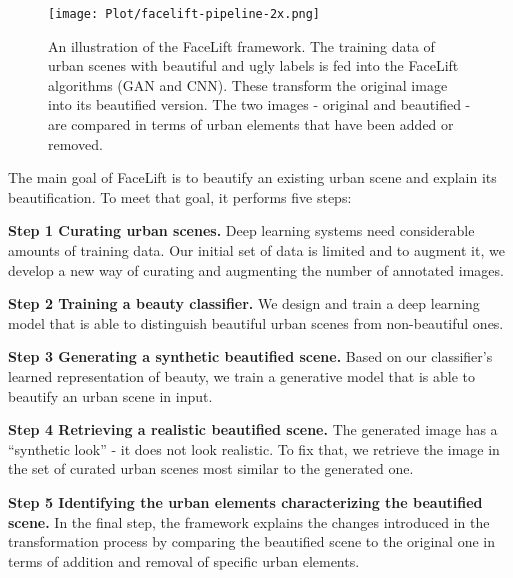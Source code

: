  \begin{figure}[ht]
	\centering
	\texttt{[image: Plot/facelift-pipeline-2x.png]}
	\caption{An illustration of the FaceLift framework. The training data of urban scenes with beautiful and ugly labels is fed into the FaceLift algorithms (GAN and CNN). These transform the original image into its beautified version. The two images - original and beautified - are compared in terms of urban elements that have been added or removed.}
	\label{fig:framework}
\end{figure}

The main goal of FaceLift is to beautify an existing urban scene and explain its beautification. To meet that goal, it performs five steps: 
\begin{description}
	\item \textbf{Step 1 Curating urban scenes.} Deep learning systems need considerable amounts of training data. Our initial set of data is limited and to augment it, we develop a new way of curating and augmenting the number of annotated images.  
	\item \textbf{Step 2 Training a beauty classifier.} We design and train a deep learning model that is able to distinguish beautiful urban scenes from non-beautiful ones. 
	\item \textbf{Step 3 Generating a synthetic beautified scene.} Based on our classifier's learned representation of beauty, we train a generative model that is able to beautify an urban scene in input. 
	\item \textbf{Step 4 Retrieving a realistic beautified scene.} The generated image has a ``synthetic look'' - it does not look realistic. To fix that, we retrieve the image in the set of curated urban scenes most similar to the generated one. 
	\item \textbf{Step 5 Identifying the urban elements characterizing the beautified scene.} In the final step, the framework explains the changes introduced in the transformation process by comparing the beautified scene to the original one in terms of addition and removal of specific urban elements. 
\end{description}



